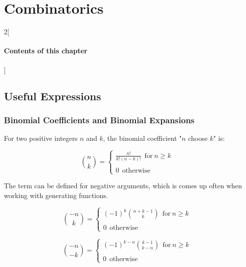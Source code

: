 \chapter{Combinatorics}

\begin{multicols}{2}[\subsubsection*{Contents of this chapter}]
\end{multicols}



\section{Useful Expressions}

\subsection{Binomial Coefficients and Binomial Expansions}

For two positive integers $n$ and $k$, the binomial coefficient "$n$ choose $k$" is:

\begin{equation}
{n \choose k} = \left\{ \begin{array}{c} 
\frac{n!}{k!(n-k)!}\ \ \mathrm{for\ }n\geq k\\
\\
0 \ \ \mathrm{otherwise}
\end{array}\right.
\end{equation}

The term can be defined for negative arguments, which is comes up often when working with generating functions.

\begin{equation}
{-n \choose k} = \left\{\begin{array}{c}
(-1)^k { n+k-1 \choose k}\ \ \mathrm{for\ }n\geq k\\
\\
0 \ \ \mathrm{otherwise}
\end{array}\right.
\end{equation}


\begin{equation}
{-n \choose -k} = \left\{\begin{array}{c}
(-1)^{k-n} {k-1 \choose k-n}\ \ \mathrm{for\ }n\geq k\\
\\
0 \ \ \mathrm{otherwise}
\end{array}\right.
\end{equation}

